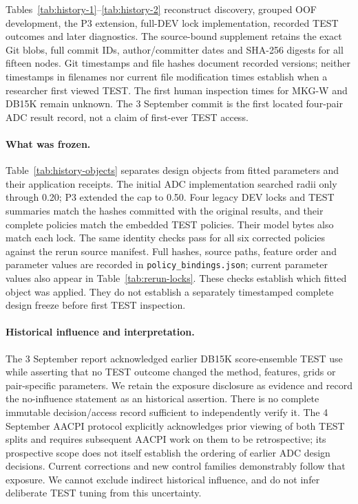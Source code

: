 \documentclass[11pt,a4paper]{article}
\begin{document}
Tables~\ref{tab:history-1}--\ref{tab:history-2} reconstruct discovery, grouped OOF development, the P3 extension, full-DEV lock implementation, recorded TEST outcomes and later diagnostics. The source-bound supplement retains the exact Git blobs, full commit IDs, author/committer dates and SHA-256 digests for all fifteen nodes. Git timestamps and file hashes document recorded versions; neither timestamps in filenames nor current file modification times establish when a researcher first viewed TEST. The first human inspection times for MKG-W and DB15K remain unknown. The 3 September commit is the first located four-pair ADC result record, not a claim of first-ever TEST access.




\paragraph{What was frozen.}
Table~\ref{tab:history-objects} separates design objects from fitted parameters and their application receipts. The initial ADC implementation searched radii only through 0.20; P3 extended the cap to 0.50. Four legacy DEV locks and TEST summaries match the hashes committed with the original results, and their complete policies match the embedded TEST policies. Their model bytes also match each lock. The same identity checks pass for all six corrected policies against the rerun source manifest. Full hashes, source paths, feature order and parameter values are recorded in \texttt{policy\_bindings.json}; current parameter values also appear in Table~\ref{tab:rerun-locks}. These checks establish which fitted object was applied. They do not establish a separately timestamped complete design freeze before first TEST inspection.



\paragraph{Historical influence and interpretation.}
The 3 September report acknowledged earlier DB15K score-ensemble TEST use while asserting that no TEST outcome changed the method, features, grids or pair-specific parameters. We retain the exposure disclosure as evidence and record the no-influence statement as an historical assertion. There is no complete immutable decision/access record sufficient to independently verify it. The 4 September AACPI protocol explicitly acknowledges prior viewing of both TEST splits and requires subsequent AACPI work on them to be retrospective; its prospective scope does not itself establish the ordering of earlier ADC design decisions. Current corrections and new control families demonstrably follow that exposure. We cannot exclude indirect historical influence, and do not infer deliberate TEST tuning from this uncertainty.
\end{document}

